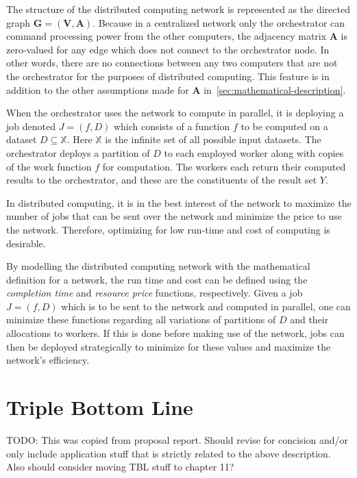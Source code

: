 \documentclass[../mthe-493-final-project.tex]{subfiles}
\begin{document}
    The structure of the distributed computing network is represented as the directed graph $\mathbf{G} = (\mathbf{V}, \mathbf{A})$. Because in a centralized network only the orchestrator can command processing power from the other computers, the adjacency matrix $\mathbf{A}$ is zero-valued for any edge which does not connect to the orchestrator node. In other words, there are no connections between any two computers that are not the orchestrator for the purposes of distributed computing. This feature is in addition to the other assumptions made for $\mathbf{A}$ in~\autoref{sec:mathematical-description}.

    When the orchestrator uses the network to compute in parallel, it is deploying a job denoted $J = (f,D)$ which consists of a function $f$ to be computed on a dataset $D \subseteq \mathbb{X}$. Here $\mathbb{X}$ is the infinite set of all possible input datasets. The orchestrator deploys a partition of $D$ to each employed worker along with copies of the work function $f$ for computation. The workers each return their computed results to the orchestrator, and these are the constituents of the result set $Y$.

    In distributed computing, it is in the best interest of the network to maximize the number of jobs that can be sent over the network and minimize the price to use the network. Therefore, optimizing for low run-time and cost of computing is desirable.

    By modelling the distributed computing network with the mathematical definition for a network, the run time and cost can be defined using the \textit{completion time} and \textit{resource price} functions, respectively. Given a job $J = (f,D)$ which is to be sent to the network and computed in parallel, one can minimize these functions regarding all variations of partitions of $D$ and their allocations to workers. If this is done before making use of the network, jobs can then be deployed strategically to minimize for these values and maximize the network's efficiency.

    \section{Triple Bottom Line}

    TODO: This was copied from proposal report. Should revise for concision and/or only include application stuff that is strictly related to the above description. Also should consider moving TBL stuff to chapter 11?
\end{document}

